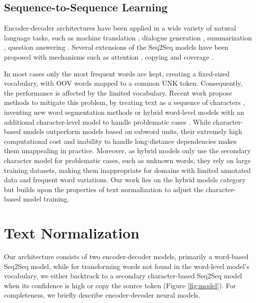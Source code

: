 \documentclass[letterpaper]{article} \usepackage{aaai19}  \usepackage{times}  \usepackage{helvet} \usepackage{courier}  \usepackage[hyphens]{url}  \usepackage{graphicx} \urlstyle{rm} \def\UrlFont{\rm}  \usepackage{graphicx}  \frenchspacing  \setlength{\pdfpagewidth}{8.5in}  \setlength{\pdfpageheight}{11in}
\newcommand{\citep}{\cite}
\begin{document}
\subsection{Sequence-to-Sequence Learning}
Encoder-decoder architectures \citep{sutskever2014sequence,cho2014learning} have been applied in a wide variety of natural language tasks, such as machine translation \citep{wu2016google}, dialogue generation \citep{vinyals2015neural}, summarization \citep{nallapati2016abstractive}, question answering \citep{yin2015neural}. Several extensions of the Seq2Seq models have been proposed with mechanisms such as attention \citep{bahdanau2014neural}, copying \citep{see2017get} and coverage \citep{tu2016modeling}.

In most cases only the most frequent words are kept, creating a fixed-sized vocabulary, with OOV words mapped to a common UNK token. Consequently, the performance is affected by the limited vocabulary. Recent work propose methods to mitigate this problem, by treating text as a sequence of characters \citep{lee2017fully}, inventing new word segmentation methods  \citep{sennrich2015neural,bojanowski2017enriching} or hybrid word-level models with an additional character-level model to handle problematic cases \citep{luong2016achieving,ji2017nested}.  While character-based models outperform models based on subword units, their extremely high computational cost and inability to handle long-distance dependencies makes them unappealing in practice. Moreover, as hybrid models only use the secondary character model for problematic cases, such as unknown words, they rely on large training datasets, making them inappropriate for domains with limited annotated data and frequent word variations. Our work lies on the hybrid models category but builds upon the properties of text normalization to adjust the character-based model training. 

\section{Text Normalization}\label{basic}
Our architecture consists of two encoder-decoder models, primarily a word-based Seq2Seq model, while for transforming words not found in the word-level model's vocabulary, we either backtrack to a secondary character-based Seq2Seq model when its confidence is high or copy the source token (Figure \ref{fig:model}). For completeness, we briefly describe encoder-decoder neural models.
\end{document}
